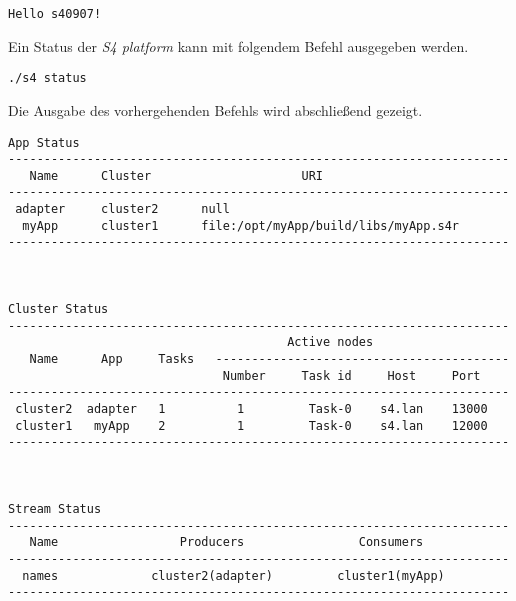 \begin{verbatim}
Hello s40907!
\end{verbatim}

Ein Status der \textit{S4 platform} kann mit folgendem Befehl ausgegeben werden.

\begin{verbatim}
./s4 status
\end{verbatim}

Die Ausgabe des vorhergehenden Befehls wird abschließend gezeigt.

\begin{verbatim}
App Status
----------------------------------------------------------------------
   Name      Cluster                     URI
----------------------------------------------------------------------
 adapter     cluster2      null
  myApp      cluster1      file:/opt/myApp/build/libs/myApp.s4r
----------------------------------------------------------------------



Cluster Status
----------------------------------------------------------------------
                                       Active nodes
   Name      App     Tasks   -----------------------------------------
                              Number     Task id     Host     Port
----------------------------------------------------------------------
 cluster2  adapter   1          1         Task-0    s4.lan    13000
 cluster1   myApp    2          1         Task-0    s4.lan    12000
----------------------------------------------------------------------



Stream Status
----------------------------------------------------------------------
   Name                 Producers                Consumers
----------------------------------------------------------------------
  names             cluster2(adapter)         cluster1(myApp)
----------------------------------------------------------------------
\end{verbatim}